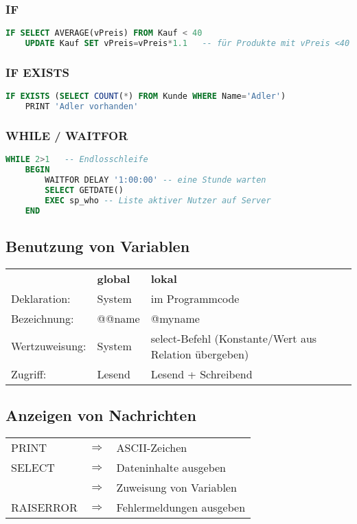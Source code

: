 \subsubsection{IF}
\begin{lstlisting}[language=SQL]
IF SELECT AVERAGE(vPreis) FROM Kauf < 40
	UPDATE Kauf SET vPreis=vPreis*1.1	-- für Produkte mit vPreis <40 wird der Preis um 10% erhöht
\end{lstlisting}
\subsubsection{IF EXISTS}
\begin{lstlisting}[language=SQL]
IF EXISTS (SELECT COUNT(*) FROM Kunde WHERE Name='Adler')
	PRINT 'Adler vorhanden'
\end{lstlisting}
\subsubsection{WHILE / WAITFOR}
\begin{lstlisting}[language=SQL]
WHILE 2>1	-- Endlosschleife
	BEGIN
		WAITFOR DELAY '1:00:00'	-- eine Stunde warten
		SELECT GETDATE()
		EXEC sp_who	-- Liste aktiver Nutzer auf Server
	END
\end{lstlisting}
\subsection{Benutzung von Variablen}
\begin{tabular}{l l l}
& \textbf{global} & \textbf{lokal} \\
Deklaration: & System & im Programmcode\\
Bezeichnung: & @@name & @myname\\
Wertzuweisung: & System & select-Befehl (Konstante/Wert aus Relation übergeben)\\
Zugriff: & Lesend & Lesend + Schreibend
\end{tabular}
\subsection{Anzeigen von Nachrichten}
\begin{tabular}{l c l}
PRINT & $\Rightarrow$ & ASCII-Zeichen\\
SELECT & $\Rightarrow$ & Dateninhalte ausgeben\\
& $\Rightarrow$ & Zuweisung von Variablen\\
RAISERROR & $\Rightarrow$ & Fehlermeldungen ausgeben
\end{tabular}

